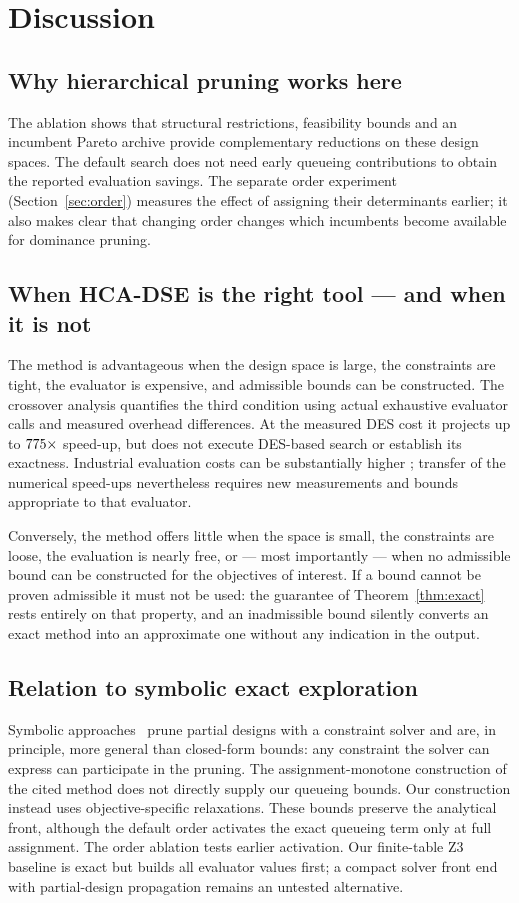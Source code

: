 \section{Discussion}
\label{sec:discussion}

\subsection{Why hierarchical pruning works here}
The ablation shows that structural restrictions, feasibility bounds and an incumbent
Pareto archive provide complementary reductions on these design spaces. The default
search does not need early queueing contributions to obtain the reported evaluation
savings. The separate order experiment (Section~\ref{sec:order}) measures the effect of
assigning their determinants earlier; it also makes clear that changing order changes
which incumbents become available for dominance pruning.

\subsection{When HCA-DSE is the right tool --- and when it is not}
The method is advantageous when the design space is large, the constraints are tight, the
evaluator is expensive, and admissible bounds can be constructed. The crossover analysis quantifies the third condition using actual exhaustive evaluator
calls and measured overhead differences. At the measured DES cost it projects up to
$775\times$ speed-up, but does not execute DES-based search or establish
its exactness. Industrial evaluation costs can be substantially higher
\cite{saadatmand2025compdse}; transfer of the numerical speed-ups nevertheless requires
new measurements and bounds appropriate to that evaluator.

Conversely, the method offers little when the space is small, the constraints are loose,
the evaluation is nearly free, or --- most importantly --- when no admissible bound can be
constructed for the objectives of interest. If a bound cannot be proven admissible it must
not be used: the guarantee of Theorem~\ref{thm:exact} rests entirely on that property, and
an inadmissible bound silently converts an exact method into an approximate one without
any indication in the output.

\subsection{Relation to symbolic exact exploration}
Symbolic approaches~\cite{neubauer2018exact} prune partial designs with a constraint
solver and are, in principle, more general than closed-form bounds: any constraint the
solver can express can participate in the pruning. The assignment-monotone construction of the cited method does not directly
supply our queueing bounds. Our construction instead uses objective-specific
relaxations. These bounds preserve the analytical front, although the default order activates the exact queueing term only at full assignment. The order ablation tests earlier activation. Our finite-table Z3 baseline is exact but builds all evaluator values first; a compact solver front end with partial-design propagation remains an untested alternative.

